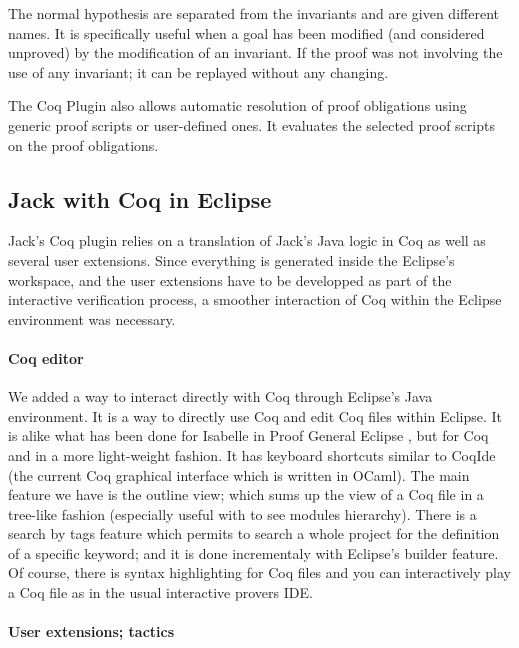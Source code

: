 The normal hypothesis are separated from the invariants and
are given different names.
It is specifically useful when a goal has been modified (and considered 
unproved) by the modification of an invariant. If the proof was not involving
the use of any invariant; it can be replayed without any changing.

The Coq Plugin also allows automatic resolution of proof obligations
using generic proof scripts or user-defined ones.
It evaluates the selected proof scripts on the proof obligations.






\subsection{Jack with Coq in Eclipse}
Jack's Coq plugin relies on a translation of Jack's Java logic in
Coq as well as several user extensions. Since everything is generated
inside the Eclipse's workspace, and the user extensions have to be 
developped as part of the interactive verification process,
 a smoother interaction of Coq within
the Eclipse environment was necessary.

\paragraph{Coq editor}
We added a way to interact directly with Coq through Eclipse's Java 
environment. It is a way to directly use Coq and edit Coq files within
Eclipse. It is alike what has been done for Isabelle in Proof General Eclipse 
\cite{WintersteinAL05}, but for Coq and in a more light-weight fashion.
It has keyboard shortcuts similar to CoqIde (the current Coq graphical
interface which is written in OCaml). 
The main feature we have is the outline view; 
which sums up the view of a Coq file in a tree-like fashion (especially useful
with to see modules hierarchy). There is a search by tags feature which
permits to search a whole project for the definition of a specific keyword; and
it is done incrementaly with Eclipse's builder feature. Of course, there is 
syntax highlighting for Coq files and you can interactively play a Coq file
as in the usual interactive provers IDE.


\paragraph{User extensions; tactics}

